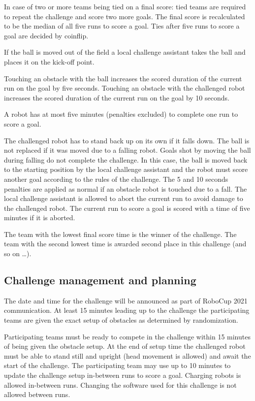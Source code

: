 In case of two or more teams being tied on a final score: tied teams are required to repeat the challenge and score two more goals. The final score is recalculated to be the median of all five runs to score a goal. Ties after five runs to score a goal are decided by coinflip.

If the ball is moved out of the field a local challenge assistant takes the ball and places it on the kick-off point.

Touching an obstacle with the ball increases the scored duration of the current run on the goal by five seconds. Touching an obstacle with the challenged robot increases the scored duration of the current run on the goal by 10 seconds.

A robot has at most five minutes (penalties excluded) to complete one run to score a goal.

The challenged robot has to stand back up on its own if it falls down. The ball is not replaced if it was moved due to a falling robot. Goals shot by moving the ball during falling do not complete the challenge. In this case, the ball is moved back to the starting position by the local challenge assistant and the robot must score another goal according to the rules of the challenge. The 5 and 10 seconds penalties are applied as normal if an obstacle robot is touched due to a fall. The local challenge assistant is allowed to abort the current run to avoid damage to the challenged robot. The current run to score a goal is scored with a time of five minutes if it is aborted.

The team with the lowest final score time is the winner of the challenge. The team with the second lowest time is awarded second place in this challenge (and so on \ldots).

\subsection{Challenge management and planning}

The date and time for the challenge will be announced as part of RoboCup 2021 communication. At least 15 minutes leading up to the challenge the participating teams are given the exact setup of obstacles as determined by randomization.

Participating teams must be ready to compete in the challenge within 15 minutes of being given the obstacle setup. At the end of setup time the challenged robot must be able to stand still and upright (head movement is allowed) and await the start of the challenge. The participating team may use up to 10 minutes to update the challenge setup in-between runs to score a goal. Charging robots is allowed in-between runs. Changing the software used for this challenge is not allowed between runs.

